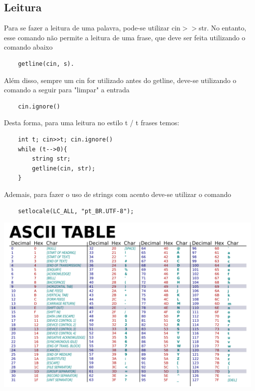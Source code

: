 \subsection{Leitura}
Para se fazer a leitura de uma palavra, pode-se utilizar cin$>>$str. No entanto, 
esse comando não permite a leitura de uma frase, que deve ser feita utilizando 
o comando abaixo
\begin{verbatim}
    getline(cin, s).
\end{verbatim}
Além disso, sempre um cin for utilizado antes do getline, deve-se utilizando o comando
a seguir para "limpar" a entrada
\begin{verbatim}
    cin.ignore()
\end{verbatim}
Desta forma, para uma leitura no estilo t / t frases temos:
\begin{verbatim}
    int t; cin>>t; cin.ignore()
    while (t-->0){
        string str;
        getline(cin, str);
    }
\end{verbatim}
Ademais, para fazer o uso de strings com acento deve-se utilizar o comando
\begin{verbatim}
    setlocale(LC_ALL, "pt_BR.UTF-8");
\end{verbatim}

\includegraphics[scale=1.0]{ASCII.png}
\pagebreak

